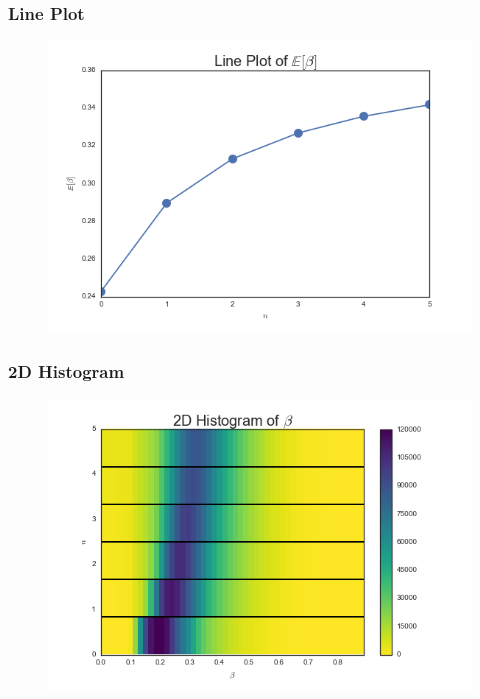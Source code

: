 \documentclass{beamer}
\begin{document}
\begin{frame}
\frametitle{Line Plot}
\begin{figure}
	\includegraphics[width=\textwidth]{lineplotmeans}
\end{figure}
\end{frame}

\begin{frame}
\frametitle{2D Histogram}
\begin{figure}
	\includegraphics[width=\textwidth]{2dhist}
\end{figure}
\end{frame}
\end{document}

